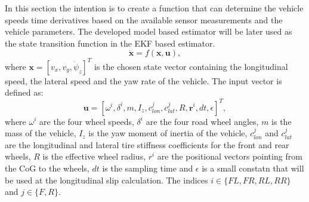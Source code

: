 In this section the intention is to create a function that can determine the vehicle speeds time derivatives based on the available sensor measurements and the vehicle parameters. The developed model based estimator will be later used as the state transition function in the EKF based estimator.
\begin{equation}
    \dot{\mathbf{x}} = f(\mathbf{x}, \mathbf{u}),
\end{equation}
where $\mathbf{x} = [v_x, v_y, \dot \psi_z]^T$ is the chosen state vector containing the longitudinal speed, the lateral speed and the yaw rate of the vehicle. The input vector is defined as:
\begin{equation}
    \mathbf{u} = [\omega^i, \delta^i, m, I_z, c_{lon}^j, c_{lat}^j, R, \mathbf{r}^i, dt, \epsilon]^T,
\end{equation}
where $\omega^i$ are the four wheel speeds, $\delta^i$ are the four road wheel angles, $m$ is the mass of the vehicle, $I_z$ is the yaw moment of inertia of the vehicle, $c_{lon}^j$ and $c_{lat}^j$ are the longitudinal and lateral tire stiffness coefficients for the front and rear wheels, $R$ is the effective wheel radius, $r^i$ are the positional vectors pointing from the CoG to the wheels, $dt$ is the sampling time and $\epsilon$ is a small constatn that will be used at the longitudinal slip calculation. The indices $i \in \{FL, FR, RL, RR\}$ and $j \in \{F, R\}$.

